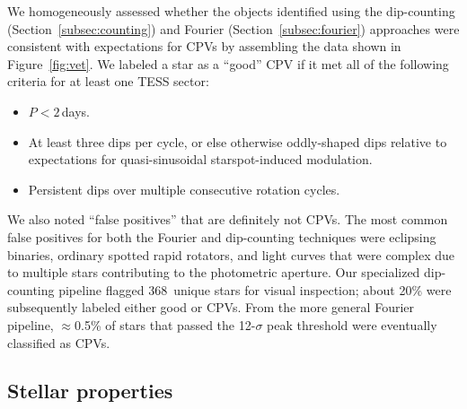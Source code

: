 \documentclass[11pt,twocolumn,tighten]{aastex63}
\newcommand{\nuniqdipflagged}{{368}} %
\begin{document}
We homogeneously assessed whether the objects identified using the
dip-counting (Section~\ref{subsec:counting}) and Fourier
(Section~\ref{subsec:fourier}) approaches were consistent with
expectations for CPVs by assembling the data shown in
Figure~\ref{fig:vet}.  We labeled a star as a ``good'' CPV if it met
all of the following criteria for at least one TESS sector:
\vspace{-2pt}
\begin{itemize}[leftmargin=*]
  \setlength\itemsep{-2pt}
  \item $P<2$\,days.
  \item At least three dips per cycle, or else otherwise oddly-shaped
    dips relative to expectations for quasi-sinusoidal
    starspot-induced modulation.
  \item Persistent dips over multiple consecutive rotation cycles.
\end{itemize}
\vspace{-2pt}
We also noted  ``false
positives'' that are definitely not CPVs.  The most common false
positives for both the Fourier and dip-counting techniques were
eclipsing binaries, ordinary spotted rapid rotators, and light curves
that were complex due to multiple stars contributing to the
photometric aperture.  Our specialized dip-counting pipeline flagged
\nuniqdipflagged\ unique stars for visual inspection; about 20\% were
subsequently labeled either good or  CPVs.  From the more
general Fourier pipeline, $\approx$0.5\% of stars that passed the
12-$\sigma$ peak threshold were eventually classified as CPVs.



\subsection{Stellar properties}
\label{subsec:starprops}
\end{document}
